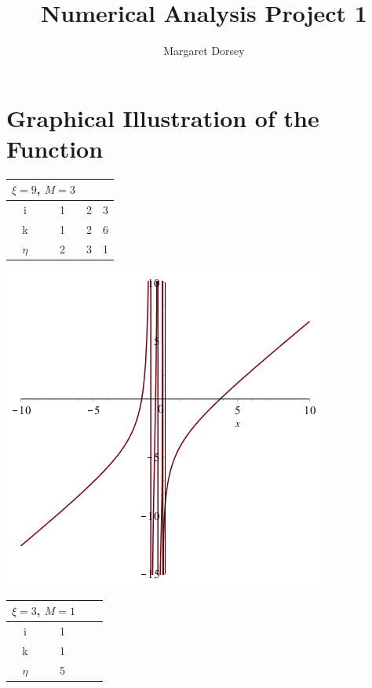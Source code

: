 \documentclass[11pt]{article} %
\title{Numerical Analysis Project 1}
\author{Margaret Dorsey}
\begin{document}
\maketitle

\section*{Graphical Illustration of the Function}
\begin{center}
\begin{tabular}[b]{||c||c c c|}
\multicolumn{2}{c}{$\xi = 9$, $M = 3$} \\ 
\hline
i & 1 & 2 & 3 \\
\hline
k & 1 & 2 & 6 \\
\hline
$\eta$ & 2 & 3 & 1 \\
\hline
\end{tabular}
\includegraphics[scale=.5]{plots/newtongraph2.png}\\
\begin{tabular}[b]{||c||c c c|}
\multicolumn{2}{c}{$\xi = 3$, $M = 1$} \\ 
\hline
i & 1 & &  \\
\hline
k & 1 & & \\
\hline
$\eta$ &5  & & \\
\hline
\end{tabular}

\end{center}
\end{document}
